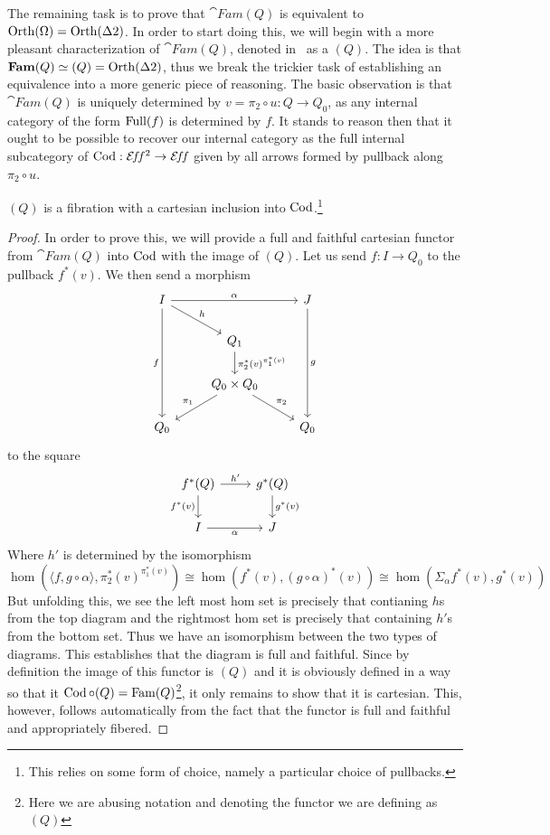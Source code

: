 The remaining task is to prove that $\cat{Fam}(Q)$ is equivalent to
$\operatorname{Orth}(\Omega) = \operatorname{Orth}(\Delta 2)$. In order to start doing this, we
will begin with a more pleasant characterization of $\cat{Fam}(Q)$,
denoted in~\citet{Hyland:90} as a $(Q)$. The idea is that
$\mathbf{Fam}(Q) \simeq (Q) = \operatorname{Orth}(\Delta 2)$, thus we break the
trickier task of establishing an equivalence into a more generic piece
of reasoning. The basic observation is that $\cat{Fam}(Q)$ is uniquely
determined by $v = \pi_2 \circ u : Q \to Q_0$, as any internal category of
the form $\operatorname{Full}(f)$ is determined by $f$. It stands to reason then
that it ought to be possible to recover our internal category as the
full internal subcategory of $\operatorname{Cod} : \mathcal{E}\!f\!f^2 \to \mathcal{E}\!f\!f$ given by all
arrows formed by pullback along $\pi_2 \circ u$.
\begin{thm}\label{thm:orth:altexternalization}
  $(Q)$ is a fibration with a cartesian inclusion into
  $\operatorname{Cod}$.\footnote{This relies on some form of choice, namely a
    particular choice of pullbacks.}
\end{thm}
\begin{proof}
  In order to prove this, we will provide a full and faithful
  cartesian functor from $\cat{Fam}(Q)$ into $\operatorname{Cod}$ with the image of
  $(Q)$. Let us send $f : I \to Q_0$ to the pullback $f^*(v)$. We then
  send a morphism
  \[
    \begin{tikzcd}
      I \ar[ddd, swap, "f"] \ar[rd, "h"] \ar[rr, "\alpha"] && J \ar[ddd, "g"]\\
      & Q_1 \ar[d, "\pi_2^*(v)^{\pi_1^*(v)}"] &\\
      & {Q_0 \times Q_0} \ar[dl, swap, "\pi_1"] \ar[dr, "\pi_2"]&\\
      Q_0 && Q_0
    \end{tikzcd}
  \]
  to the square
  \[
    \begin{tikzcd}
      f^*(Q) \ar[d, swap, "f^*(v)"] \ar[r, "h'"] & g^*(Q) \ar[d, "g^*(v)"]\\
      I \ar[r, swap, "\alpha"] & J
    \end{tikzcd}
  \]
  Where $h'$ is determined by the isomorphism
  \[
    \hom(\langle f, g \circ \alpha \rangle, \pi_2^*(v)^{\pi_1^*(v)}) \cong
    \hom(f^*(v), (g \circ \alpha)^*(v)) \cong
    \hom(\Sigma_\alpha f^*(v), g^*(v))
  \]
  But unfolding this, we see the left most hom set is precisely that
  contianing $h$s from the top diagram and the rightmost hom set is
  precisely that containing $h'$s from the bottom set. Thus we have an
  isomorphism between the two types of diagrams. This establishes that
  the diagram is full and faithful. Since by definition the image of
  this functor is $(Q)$ and it is obviously defined in a way so that
  it $\operatorname{Cod} \circ (Q) = \operatorname{Fam}(Q)$\footnote{Here we are abusing
    notation and denoting the functor we are defining as $(Q)$}, it
  only remains to show that it is cartesian. This, however, follows
  automatically from the fact that the functor is full and faithful
  and appropriately fibered.
\end{proof}
